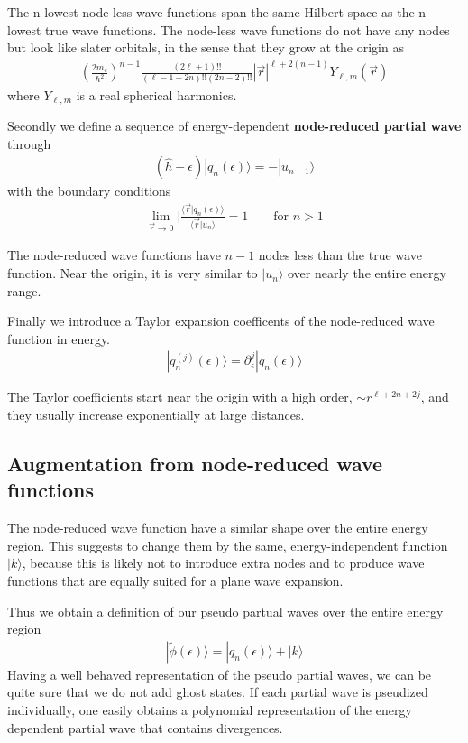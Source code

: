 \documentclass[11pt,a4paper]{report}
\begin{document}
The n lowest node-less wave functions span the same Hilbert space as
the n lowest true wave functions. The node-less wave functions do not
have any nodes but look like slater orbitals, in the sense that they
grow at the origin as
\begin{eqnarray}
\left(\frac{2m_e}{\hbar^2}\right)^{n-1}\frac{(2\ell+1)!!}{(\ell-1+2n)!!(2n-2)!!}
|\vec{r}|^{\ell+2(n-1)}Y_{\ell,m}(\vec{r})
\end{eqnarray}
where $Y_{\ell,m}$ is a real spherical harmonics.

Secondly we define a sequence of energy-dependent 
\textbf{node-reduced partial wave}
through
\begin{eqnarray}
(\hat{h}-\epsilon)|q_n(\epsilon)\rangle=-|u_{n-1}\rangle
\end{eqnarray}
with the boundary conditions
\begin{eqnarray}
\lim_{\vec{r}\rightarrow0}|
\frac{\langle\vec{r}|q_n(\epsilon)\rangle}
{\langle\vec{r}|u_n\rangle}=1
\qquad\text{for $n>1$}
\end{eqnarray}

The node-reduced wave functions have $n-1$ nodes less than the true
wave function. Near the origin, it is very similar to $|u_n\rangle$
over nearly the entire energy range.

Finally we introduce a Taylor expansion coefficents of the
node-reduced wave function in energy.
\begin{eqnarray}
|q_n^{(j)}(\epsilon)\rangle=\partial_\epsilon^j|q_n(\epsilon)\rangle
\end{eqnarray}

The Taylor coefficients start near the origin with a high order, $\sim
r^{\ell+2n+2j}$, and they usually increase exponentially at large
distances.

\subsection{Augmentation from node-reduced wave functions}
The node-reduced wave function have a similar shape over the entire
energy region. This suggests to change them by the same,
energy-independent function $|k\rangle$, because this is likely not to
introduce extra nodes and to produce wave functions that are equally
suited for a plane wave expansion.

Thus we obtain a definition of our pseudo partual waves over the
entire energy region
\begin{eqnarray}
|\tilde{\phi}(\epsilon)\rangle=|q_n(\epsilon)\rangle+|k\rangle
\end{eqnarray}
Having a well behaved representation of the pseudo partial waves, we
can be quite sure that we do not add ghost states. If each partial
wave is pseudized individually, one easily obtains a polynomial
representation of the energy dependent partial wave that contains
divergences.
\end{document}
